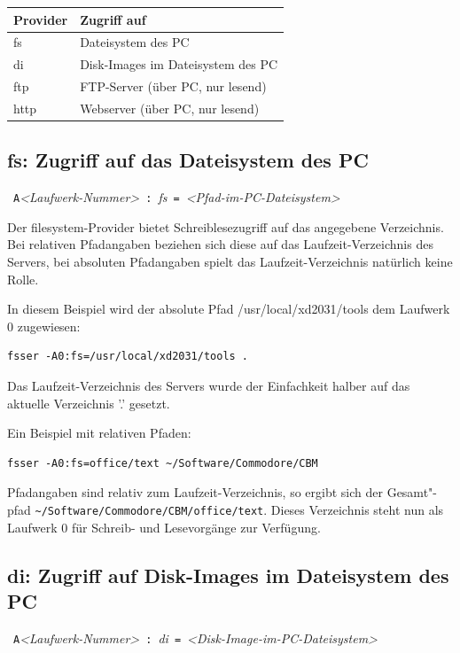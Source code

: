 \documentclass[10pt,a4paper]{scrartcl}		%
\begin{document}
\begin{tabular}[c]{l l}
\toprule 
Provider & Zugriff auf \\
\midrule
fs & Dateisystem des PC \\
di & Disk-Images im Dateisystem des PC  \\
ftp & FTP-Server (über PC, nur lesend) \\
http & Webserver (über PC, nur lesend) \\
\bottomrule
\end{tabular}

\subsection{fs: Zugriff auf das Dateisystem des PC}
\mbox{ \texttt{A}\textit{<Laufwerk-Nummer>} 
\texttt{:} \textit{fs} \texttt{=}
\textit{<Pfad-im-PC-Dateisystem>} }

Der filesystem-Provider bietet Schreiblesezugriff auf das
angegebene Verzeichnis. Bei relativen Pfadangaben beziehen sich diese
auf das Laufzeit-Verzeichnis des Servers, bei absoluten Pfadangaben
spielt das Laufzeit-Verzeichnis natürlich keine Rolle.

In diesem Beispiel wird der absolute Pfad /usr/local/xd2031/tools
dem Laufwerk 0 zugewiesen:

\begin{verbatim}
fsser -A0:fs=/usr/local/xd2031/tools .
\end{verbatim}

Das Laufzeit-Verzeichnis des Servers wurde der Einfachkeit halber
auf das aktuelle Verzeichnis '.' gesetzt.

Ein Beispiel mit relativen Pfaden:

\begin{verbatim}
fsser -A0:fs=office/text ~/Software/Commodore/CBM
\end{verbatim}

Pfadangaben sind relativ zum Laufzeit-Verzeichnis, 
so ergibt sich der Gesamt"-pfad  
\texttt{\~{}/Software/Commodore/CBM/office/text}.
Dieses Verzeichnis steht nun als Laufwerk 0 
für Schreib- und Lesevorgänge zur Verfügung.

\subsection{di: Zugriff auf Disk-Images im Dateisystem des PC}
\mbox{ \texttt{A}\textit{<Laufwerk-Nummer>} 
\texttt{:} \textit{di} \texttt{=}
\textit{<Disk-Image-im-PC-Dateisystem>} }
\end{document}
